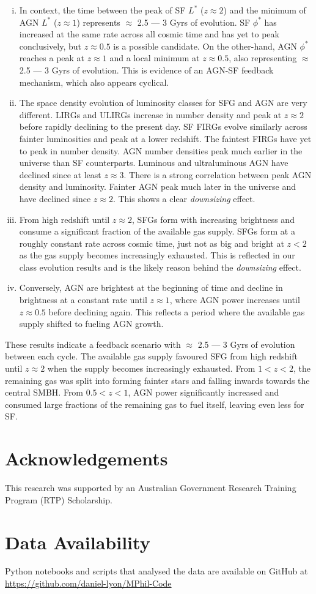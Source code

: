 \begin{enumerate}[(i)]
    \item In context, the time between the peak of SF $L^{*}$ ($z\approx2$) and the minimum of AGN $L^{*}$ ($z\approx1$) represents $\approx$ 2.5 --- 3 Gyrs of evolution. SF $\phi^{*}$ has increased at the same rate across all cosmic time and has yet to peak conclusively, but $z\approx0.5$ is a possible candidate. On the other-hand, AGN $\phi^{*}$ reaches a peak at $z\approx1$ and a local minimum at $z\approx0.5$, also representing $\approx$ 2.5 --- 3 Gyrs of evolution. This is evidence of an AGN-SF feedback mechanism, which also appears cyclical. 

    \item The space density evolution of luminosity classes for SFG and AGN are very different. LIRGs and ULIRGs increase in number density and peak at $z \approx 2$ before rapidly declining to the present day. SF FIRGs evolve similarly across fainter luminosities and peak at a lower redshift. The faintest FIRGs have yet to peak in number density. AGN number densities peak much earlier in the universe than SF counterparts. Luminous and ultraluminous AGN have declined since at least $z \approx 3$. There is a strong correlation between peak AGN density and luminosity. Fainter AGN peak much later in the universe and have declined since $z \approx 2$. This shows a clear \textit{downsizing} effect.

    \item From high redshift until $z\approx2$, SFGs form with increasing brightness and consume a significant fraction of the available gas supply. SFGs form at a roughly constant rate across cosmic time, just not as big and bright at $z<2$ as the gas supply becomes increasingly exhausted. This is reflected in our class evolution results and is the likely reason behind the \textit{downsizing} effect.

    \item Conversely, AGN are brightest at the beginning of time and decline in brightness at a constant rate until $z\approx1$, where AGN power increases until $z\approx0.5$ before declining again. This reflects a period where the available gas supply shifted to fueling AGN growth.
\end{enumerate}

These results indicate a feedback scenario with $\approx$ 2.5 --- 3 Gyrs of evolution between each cycle. The available gas supply favoured SFG from high redshift until $z\approx2$ when the supply becomes increasingly exhausted. From $1<z<2$, the remaining gas was split into forming fainter stars and falling inwards towards the central SMBH. From $0.5<z<1$, AGN power significantly increased and consumed large fractions of the remaining gas to fuel itself, leaving even less for SF. 

\section*{Acknowledgements}
This research was supported by an Australian Government Research Training Program (RTP) Scholarship.

\section*{Data Availability}
Python notebooks and scripts that analysed the data are available on GitHub at \url{https://github.com/daniel-lyon/MPhil-Code}